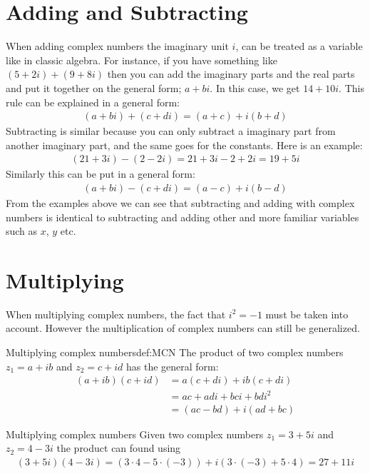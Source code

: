 
\section{Adding and Subtracting}
When adding complex numbers the imaginary unit $i$, can be treated as a variable like in classic algebra. For instance, if you have something like $(5+2i)+(9+8i)$ then you can add the imaginary parts and the real parts and put it together on the general form; $a+bi$. In this case, we get $14+10i$. This rule can be explained in a general form: 
\begin{align*}
(a + bi) + (c + di) = (a + c) + i(b + d)
\end{align*}
Subtracting is similar because you can only subtract a imaginary part from another imaginary part, and the same goes for the constants. Here is an example:
\begin{align*}
(21 + 3i) - (2 - 2i) = 21 + 3i - 2 + 2i = 19 + 5i
\end{align*}
Similarly this can be put in a general form:
\begin{align*}
(a + bi) - (c + di) = (a - c) + i(b - d)
\end{align*}
From the examples above we can see that subtracting and adding with complex numbers is identical to subtracting and adding other and more familiar variables such as $x$, $y$ etc.

\section{Multiplying}
When multiplying complex numbers, the fact that $i^2 =-1$ must be taken into account. However the multiplication of complex numbers can still be generalized. 
\begin{definition}{Multiplying complex numbers}{def:MCN}
The product of two complex numbers $z_1=a+ib$ and $z_2=c+id$ has the general form:
\begin{align*}
(a+ib)(c+id)&=a(c+di)+ib(c+di)
\\
&=ac+adi+bci+bdi^2
\\
&=(ac-bd)+i(ad+bc)
\end{align*}
\end{definition}
\begin{example}{Multiplying complex numbers}{}
Given two complex numbers $z_1=3+5i$ and $z_2=4-3i$ the product can found using 
\begin{align*}
(3+5i)(4-3i) = (3\cdot4-5\cdot(-3))+i(3\cdot(-3)+5\cdot4)=27+11i
\end{align*}
\end{example}


